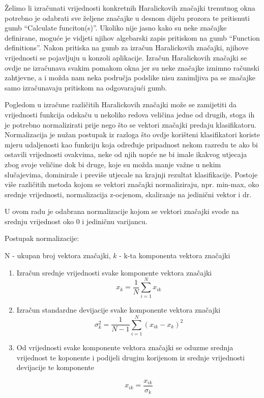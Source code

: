 \documentclass[times, utf8, zavrsni]{fer}
\begin{document}
\bigbreak

Želimo li izračunati vrijednosti konkretnih Haralickovih značajki 
trenutnog okna potrebno je odabrati sve željene značajke u desnom dijelu
prozora te pritisnuti gumb \enquote{Calculate funciton(s)}. Ukoliko
nije jasno kako su neke značajke definirane, moguće je vidjeti njihov
algebarski zapis pritiskom na gumb \enquote{Function definitions}. 
Nakon pritiska na gumb za izračun Haralickovih značajki, njihove vrijednosti
se pojavljuju u konzoli aplikacije. Izračun Haralickovih značajki se ovdje 
ne izračunava svakim pomakom okna jer su neke značajke iznimno 
računski zahtjevne, a i možda nam neka područja podslike nisu zanimljiva
pa se značajke samo izračunavaju pritiskom na odgovarajući gumb.

\bigbreak

Pogledom u izračune različitih Haralickovih značajki može se zamijetiti da vrijednosti funkcija 
odskaču u nekoliko redova veličina jedne od drugih, stoga ih je potrebno normalizirati
prije nego što se vektori značajki predaju klasifikatoru. Normalizacija
je nužan postupak iz razloga što ovdje korišteni klasifikatori koriste mjeru udaljenosti
kao funkciju koja određuje pripadnost nekom razredu te ako bi ostavili 
vrijednosti ovakvima, neke od njih uopće ne bi imale ikakvog utjecaja zbog 
svoje veličine dok bi druge, koje su možda manje važne u nekim slučajevima,
dominirale i previše utjecale na krajnji rezultat klasifikacije. Postoje više različitih 
metoda kojom se vektori značajki normaliziraju, npr. min-max, oko srednje vrijednosti, 
normalizacija z-ocjenom, skaliranje na jedinični vektor i dr. 

\bigbreak

U ovom radu je odabrana normalizacije kojom se vektori značajki svode na srednju vrijednost oko 0
i jediničnu varijancu.

\newpage

Postupak normalizacije:
\begin{center}

N - ukupan broj vektora značajki, \(k\) - k-ta komponenta vektora značajki

\begin{enumerate}
\item Izračun srednje vrijednosti svake komponente vektora značajki
\[
x_k = \frac{1}{N}\sum_{i=1}^{N}x_{ik}
\]

\item Izračun standardne devijacije svake komponente vektora značajki
\[
\sigma_k^2 = \frac{1}{N-1}\sum_{i=1}^N\left(x_{ik}-x_k\right)^2
\]

\item Od vrijednosti svake komponente vektora značajki se oduzme srednja
vrijednost te koponente i podijeli drugim korijenom iz srednje vrijednosti
devijacije te komponente

\[
x_{ik} = \frac{x_{ik}}{\sigma_k}
\]

\end{enumerate}
\end{center}
\end{document}
